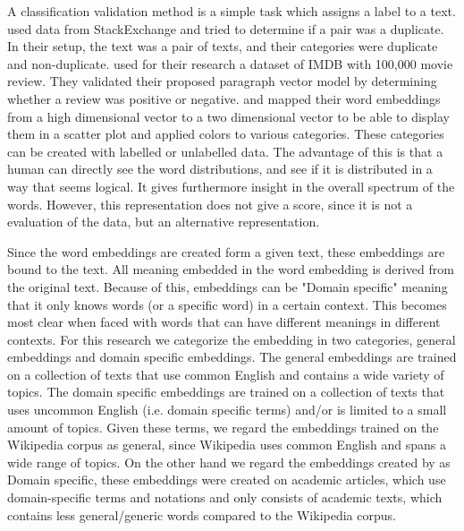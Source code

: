 \documentclass[../../Thesis.tex]{subfiles}
\begin{document}
\begin{jumpin}
A classification validation method is a simple task which assigns a label to a text. \citet{lau2016empirical} used data from StackExchange and tried to determine if a pair was a duplicate. In their setup, the text was a pair of texts, and their categories were duplicate and non-duplicate. \citet{le2014distributed} used for their research a dataset of IMDB with 100,000 movie review. They validated their proposed paragraph vector model by determining whether a review was positive or negative.
\citet{dai2015document} and \citet{hinton2003stochastic} mapped their word embeddings from a high dimensional vector to a two dimensional vector to be able to display them in a scatter plot and applied colors to various categories. These categories can be created with labelled or unlabelled data. The advantage of this is that a human can directly see the word distributions, and see if it is distributed in a way that seems logical. It gives furthermore insight in the overall spectrum of the words. However, this representation does not give a score, since it is not a evaluation of the data, but an alternative representation. 
\end{jumpin}
Since the word embeddings are created form a given text, these embeddings are bound to the text. All meaning embedded in the word embedding is derived from the original text. Because of this, embeddings can be "Domain specific" meaning that it only knows words (or a specific word) in a certain context. This becomes most clear when faced with words that can have different meanings in different contexts. For this research we categorize the embedding in two categories, general embeddings and domain specific embeddings. The general embeddings are trained on a collection of texts that use common English and contains a wide variety of topics. The domain specific embeddings are trained on a collection of texts that uses uncommon English (i.e. domain specific terms) and/or is limited to a small amount of topics. Given these terms, we regard the embeddings trained on the Wikipedia corpus\cite{lai2016generate, pennington2014glove, dai2015document, lau2016empirical, schnabel2015evaluation} as general, since Wikipedia uses common English and spans a wide range of topics. On the other hand we regard the embeddings created by \citet{Truong2017Thesis} as Domain specific, these embeddings were created on academic articles, which use domain-specific terms and notations and only consists of academic texts, which contains less general/generic words compared to the Wikipedia corpus.
\end{document}
